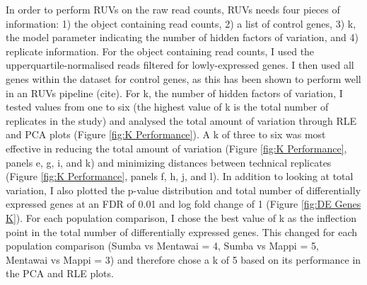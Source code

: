 \documentclass[12pt,a4paper,titlepage,twoside,openright]{book}
\begin{document}
\begin{mainmatter}
In order to perform RUVs on the raw read counts, RUVs needs four pieces of information: 1) the object containing read counts, 2) a list of control genes, 3) k, the model parameter indicating the number of hidden factors of variation, and 4) replicate information. For the object containing read counts, I used the upperquartile-normalised reads filtered for lowly-expressed genes. I then used all genes within the dataset for control genes, as this has been shown to perform well in an RUVs pipeline (cite). For k, the number of hidden factors of variation, I tested values from one to six (the highest value of k is the total number of replicates in the study) and analysed the total amount of variation through RLE and PCA plots (﻿Figure \ref{fig:K Performance}﻿). A k of three to six was most effective in reducing the total amount of variation (﻿Figure \ref{fig:K Performance}, panels e, g, i, and k) and minimizing distances between technical replicates (﻿Figure \ref{fig:K Performance}, panels f, h, j, and l). In addition to looking at total variation, I also plotted the p-value distribution and total number of differentially expressed genes at an FDR of 0.01 and log fold change of 1 (﻿Figure \ref{fig:DE Genes K}). For each population comparison, I chose the best value of k as the inflection point in the total number of differentially expressed genes. This changed for each population comparison (Sumba vs Mentawai = 4, Sumba vs Mappi = 5, Mentawai vs Mappi = 3) and therefore chose a k of 5 based on its performance in the PCA and RLE plots. 


\end{mainmatter}
\end{document}
